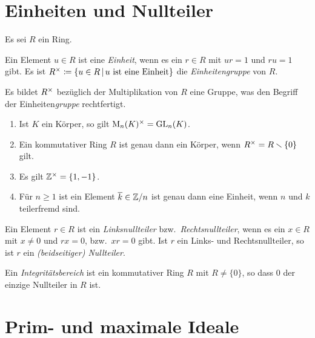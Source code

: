 \section{Einheiten und Nullteiler}

Es sei $R$ ein Ring.

\begin{definition}
  Ein Element $u \in R$ ist eine \emph{Einheit}, wenn es ein $r \in R$ mit $ur = 1$ und $ru = 1$ gibt.
  Es ist
  $
              \unitgroup{R}
    \defined  \{
                u \in R
              \suchthat 
                \text{$u$ ist eine Einheit}
              \}
  $
  die \emph{Einheitengruppe} von $R$.
\end{definition}

Es bildet $R^{\times}$ bezüglich der Multiplikation von $R$ eine Gruppe, was den Begriff der Einheiten\emph{gruppe} rechtfertigt.

\begin{example}
  \begin{enumerate}
    \item
      Ist $K$ ein Körper, so gilt $\operatorname{M}_{n}(K)^{\times} = \operatorname{GL}_{n}(K)$.
    \item
      Ein kommutativer Ring $R$ ist genau dann ein Körper, wenn $R^{\times} = R \smallsetminus \{0\}$ gilt.
    \item
      Es gilt $\mathbb{Z}^{\times} = \{1, -1\}$.
    \item
      Für $n \geq 1$ ist ein Element $\overline{k} \in \mathbb{Z}/n$ ist genau dann eine Einheit, wenn $n$ und $k$ teilerfremd sind.
  \end{enumerate}
\end{example}

\begin{definition}
  Ein Element $r \in R$ ist ein \emph{Linksnullteiler} bzw.\ \emph{Rechtsnullteiler}, wenn es ein $x \in R$ mit $x \neq 0$ und $rx = 0$, bzw.\ $xr = 0$ gibt.
  Ist $r$ ein Links- und Rechtsnullteiler, so ist $r$ ein \emph{\textup(beidseitiger\textup) Nullteiler}.
\end{definition}

\begin{definition}
  Ein \emph{Integritätsbereich} ist ein kommutativer Ring $R$ mit $R \neq \{0\}$, so dass $0$ der einzige Nullteiler in $R$ ist.
\end{definition}






\section{Prim- und maximale Ideale}

